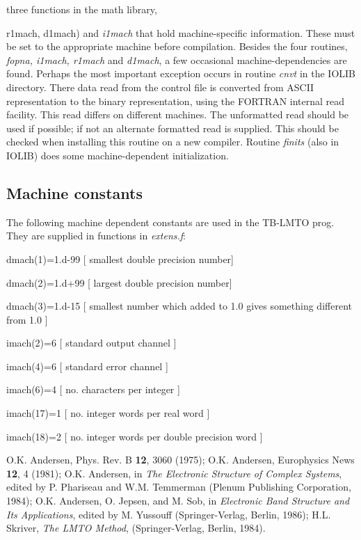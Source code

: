 \documentclass[aps,twocolumn,a4]{revtex4}
\begin{document}
three functions in the math library, {\rm r1mach, d1mach) and
{\em i1mach} that hold
machine-specific information.  These must be set to the appropriate
machine before compilation.  Besides the four routines,
{\em fopna, i1mach, r1mach} and
{\em d1mach}, a few occasional machine-dependencies are found.
Perhaps the most important exception occurs in routine {\em cnvt} in
the IOLIB directory.
There data read from the control file is converted from ASCII
representation to the binary representation, using the FORTRAN internal
read facility.  This read differs on different machines.  The
unformatted read should be used if possible; if not an alternate
formatted read is supplied.  This should be checked when installing this
routine on a new compiler.  Routine {\em finits} (also in IOLIB) does
some machine-dependent initialization.

\subsection{Machine constants}

The following machine dependent constants are used in the TB-LMTO prog.
They are supplied in functions in {\em extens.f}:

dmach(1)=1.d-99 [ smallest double precision number]

dmach(2)=1.d+99 [ largest double precision number]

dmach(3)=1.d-15 [ smallest number which added to 1.0 gives something
different from 1.0 ]

imach(2)=6 [ standard output channel ]

imach(4)=6 [ standard error channel ]

imach(6)=4 [ no. characters per integer ]

imach(17)=1 [ no. integer words per real word ]

imach(18)=2 [ no. integer words per double precision word ]

%
\begin{references}

 O.K. Andersen, Phys. Rev. B {\bf 12}, 3060 (1975);
O.K. Andersen, Europhysics News {\bf 12}, 4 (1981);
O.K. Andersen, in {\it The Electronic Structure of Complex Systems},
edited by P. Phariseau and W.M. Temmerman (Plenum Publishing
Corporation, 1984); O.K. Andersen, O. Jepsen, and M. Sob, in
{\it Electronic Band Structure and Its Applications}, edited by
M. Yussouff (Springer-Verlag, Berlin, 1986); H.L. Skriver, {\it
The LMTO Method}, (Springer-Verlag, Berlin, 1984).


\end{references}}
\end{document}
